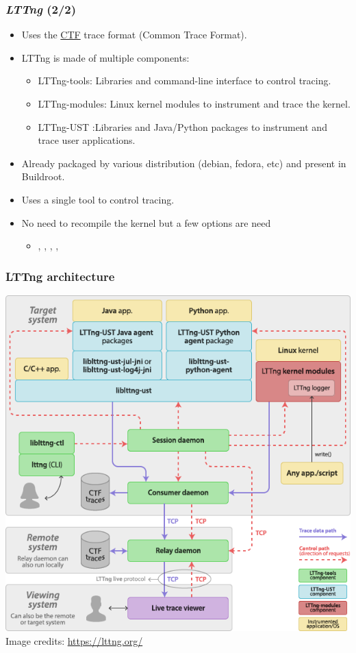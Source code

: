 \begin{frame}
  \frametitle{{\em LTTng} (2/2)}
  \begin{itemize}
    \item Uses the \href{https://diamon.org/ctf/}{CTF} trace format (Common
          Trace Format).
    \item LTTng is made of multiple components:
    \begin{itemize}
      \item LTTng-tools: Libraries and command-line interface to control tracing.
      \item LTTng-modules: Linux kernel modules to instrument and trace the kernel.
      \item LTTng-UST :Libraries and Java/Python packages to instrument and trace user applications.
    \end{itemize}
    \item Already packaged by various distribution (debian, fedora, etc) and
          present in Buildroot.
    \item Uses a single tool  to control tracing.
    \item No need to recompile the kernel but a few options are need
    \begin{itemize}
      \item {}, , ,
            , 
    \end{itemize}
  \end{itemize}
\end{frame}

\begin{frame}[fragile]
  \frametitle{LTTng architecture}
  \begin{center}
    \includegraphics[height=0.8\textheight]{slides/debugging-system-wide-profiling/lttng_graph.png}\\
    \tiny Image credits: \url{https://lttng.org/}
  \end{center}
\end{frame}

